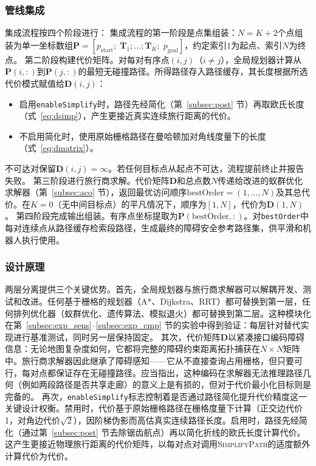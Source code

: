 \documentclass[lettersize,journal]{IEEEtran}
\begin{document}
\subsubsection{管线集成}
集成流程按四个阶段进行：
集成流程的第一阶段是点集组装：$N = K + 2$个点组装为单一坐标数组$\mathbf{P} = [p_{\mathrm{start}};\; \mathbf{T}_1; \dots; \mathbf{T}_K;\; p_{\mathrm{goal}}]$，约定索引$1$为起点、索引$N$为终点。
第二阶段构建代价矩阵。对每对有序点$(i, j)$（$i \neq j$），全局规划器计算从$\mathbf{P}(i,:)$到$\mathbf{P}(j,:)$的最短无碰撞路径。所得路径存入路径缓存，其长度根据所选代价模式赋值给$\mathbf{D}(i, j)$：
\begin{itemize}
\item 启用\texttt{enableSimplify}时，路径先经简化（第~\ref{subsec:post} 节）再取欧氏长度（式~\eqref{eq:dsimp}），产生更接近真实连续旅行距离的代价。
\item 不启用简化时，使用原始栅格路径在曼哈顿加对角线度量下的长度（式~\eqref{eq:dmatrix}）。
\end{itemize}
不可达对保留$\mathbf{D}(i, j) = \infty$。若任何目标点从起点不可达，流程提前终止并报告失败。
第三阶段进行旅行商求解。代价矩阵$\mathbf{D}$和总点数$N$传递给改进的蚁群优化求解器（第~\ref{subsec:aco} 节），返回最优访问顺序$\mathrm{bestOrder} = (1, \dots, N)$及其总代价。在$K = 0$（无中间目标点）的平凡情况下，顺序为$[1, N]$，代价为$\mathbf{D}(1, N)$。
第四阶段完成输出组装。有序点坐标提取为$\mathbf{P}(\mathrm{bestOrder}, :)$。对\texttt{bestOrder}中每对连续点从路径缓存检索段路径，生成最终的障碍安全参考路径集，供平滑和机器人执行使用。
\subsubsection{设计原理}
两层分离提供三个关键优势。首先，全局规划器与旅行商求解器可以解耦开发、测试和改进。任何基于栅格的规划器（A*、Dijkstra、RRT）都可替换到第一层，任何排列优化器（蚁群优化、遗传算法、模拟退火）都可替换到第二层。这种模块化在第~\ref{subsec:exp_sens}--\ref{subsec:exp_cmp} 节的实验中得到验证：每层针对替代实现进行基准测试，同时另一层保持固定。
其次，代价矩阵$\mathbf{D}$以紧凑接口编码障碍信息：无论地图复杂度如何，它都将完整的障碍约束距离拓扑捕获在$N \times N$矩阵中。旅行商求解器因此继承了障碍感知——它从不直接查询占用栅格，但只要可行，每对点都保证存在无碰撞路径。应当指出，这种编码在求解器无法推理路径几何（例如两段路径是否共享走廊）的意义上是有损的，但对于代价最小化目标则是完备的。
再次，\texttt{enableSimplify}标志控制着是否通过路径简化提升代价精度这一关键设计权衡。禁用时，代价基于原始栅格路径在栅格度量下计算（正交边代价1，对角边代价$\sqrt{2}$），因阶梯伪影而高估真实连续路径长度。启用时，路径先经简化（通过第~\ref{subsec:post} 节去除锯齿航点）再以简化折线的欧氏长度计算代价。这产生更接近物理旅行距离的代价矩阵，以每对点对调用\textsc{SimplifyPath}的适度额外计算代价为代价。
\end{document}
